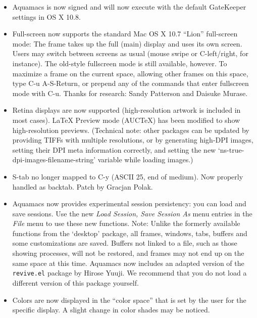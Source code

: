 \begin{itemize}

\item Aquamacs is now signed and will now execute with the default GateKeeper settings in OS X 10.8.
\item Full-screen now supports the standard Mac OS X 10.7 ``Lion'' full-screen mode:  The frame takes up the full (main) display and uses its own screen.  Users may switch between screens as usual (mouse swipe or C-left/right, for instance).  The old-style fullscreen mode is still available, however.  To maximize a frame on the current space, allowing other frames on this space, type C-u A-S-Return, or prepend any of the commands that enter fullscreen mode with C-u.
Thanks for research: Sandy Patterson and Daisuke Murase.
\item Retina displays are now supported (high-resolution artwork is included in most cases).  LaTeX Preview mode (AUCTeX) has been modified to show high-resolution previews.  (Technical note: other packages can be updated by providing TIFFs with multiple resolutions, or by generating high-DPI images, setting their DPI meta information correctly, and setting the new `ns-true-dpi-images-filename-string' variable while loading images.)
\item S-tab no longer mapped to C-y (ASCII 25, end of medium). Now properly handled as backtab.  Patch by Gracjan Polak.
\item Aquamacs now provides experimental session persistency:  you can load and save sessions.  Use the new {\em Load Session, Save Session As} menu entries in the {\em File} menu to use these new functions.  Note: Unlike the formerly available functions from the `desktop' package, all frames, windows, tabs, buffers and some customizations are saved.  Buffers not linked to a file, such as those showing processes, will not be restored, and frames may not end up on the same space at this time.  Aquamacs now includes an adapted version of the {\tt revive.el} package by Hirose Yuuji.  We recommend that you do not load a different version of this package yourself.
\item Colors are now displayed in the ``color space'' that is set by the user for the specific display.  A slight change in color shades may be noticed.

\end{itemize}
